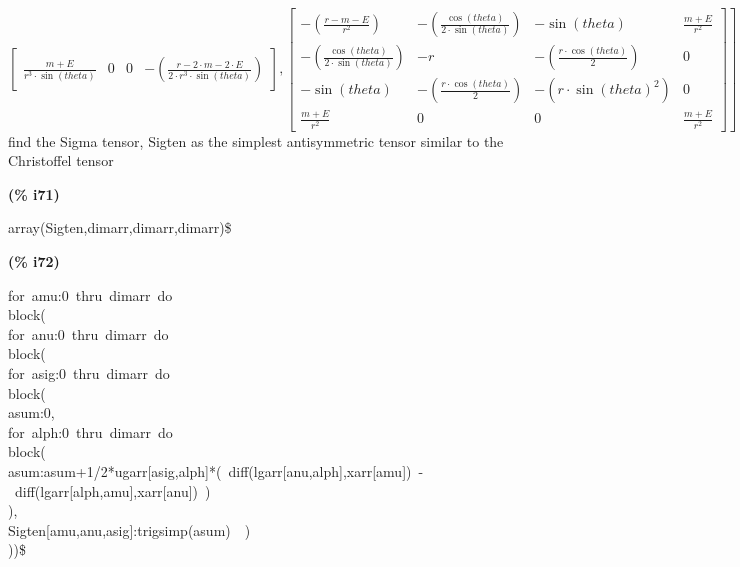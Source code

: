\documentclass[fleqn]{article}
\begin{document}
\[\begin{bmatrix}
\frac{m\mathop{+}E}{{{r}^{3}}\mathop{\ensuremath{\cdot}}\sin{(theta)}} & 0 & 0 & \mathop{-}\left( \frac{r\mathop{-}2\mathop{\ensuremath{\cdot}}m\mathop{-}2\mathop{\ensuremath{\cdot}}E}{2\mathop{\ensuremath{\cdot}}{{r}^{3}}\mathop{\ensuremath{\cdot}}\sin{(theta)}}\right) \end{bmatrix}\mathop{,}\begin{bmatrix}\mathop{-}\left( \frac{r\mathop{-}m\mathop{-}E}{{{r}^{2}}}\right)  & \mathop{-}\left( \frac{\cos{(theta)}}{2\mathop{\ensuremath{\cdot}}\sin{(theta)}}\right)  & \mathop{-}\sin{(theta)} & \frac{m\mathop{+}E}{{{r}^{2}}}\\
\mathop{-}\left( \frac{\cos{(theta)}}{2\mathop{\ensuremath{\cdot}}\sin{(theta)}}\right)  & \mathop{-}r & \mathop{-}\left( \frac{r\mathop{\ensuremath{\cdot}}\cos{(theta)}}{2}\right)  & 0\\
\mathop{-}\sin{(theta)} & \mathop{-}\left( \frac{r\mathop{\ensuremath{\cdot}}\cos{(theta)}}{2}\right)  & \mathop{-}\left( r\mathop{\ensuremath{\cdot}}{{\sin{(theta)}}^{2}}\right)  & 0\\
\frac{m\mathop{+}E}{{{r}^{2}}} & 0 & 0 & \frac{m\mathop{+}E}{{{r}^{2}}}\end{bmatrix}\mathop{]}\mbox{}
\]
find the Sigma tensor, Sigten as the simplest antisymmetric tensor similar to the Christoffel tensor


\noindent
\begin{minipage}[t]{4.000000em}\color{red}\bfseries
(\% i71)	
\end{minipage}
\begin{minipage}[t]{\textwidth}\color{blue}
array(Sigten,dimarr,dimarr,dimarr)\$
\end{minipage}

\noindent%



\noindent
\begin{minipage}[t]{4.000000em}\color{red}\bfseries
(\% i72)	
\end{minipage}
\begin{minipage}[t]{\textwidth}\color{blue}
for\ amu:0\ thru\ dimarr\ do\\
block(\\
for\ anu:0\ thru\ dimarr\ do\\
block(\\
for\ asig:0\ thru\ dimarr\ do\\
block(\\
asum:0,\\
for\ alph:0\ thru\ dimarr\ do\\
block(\\
asum:asum+1/2*ugarr[asig,alph]*(\ diff(lgarr[anu,alph],xarr[amu])\ -\ diff(lgarr[alph,amu],xarr[anu])\ )\\
),\\
Sigten[amu,anu,asig]:trigsimp(asum)\ \ )\\
))\$
\end{minipage}
\end{document}
